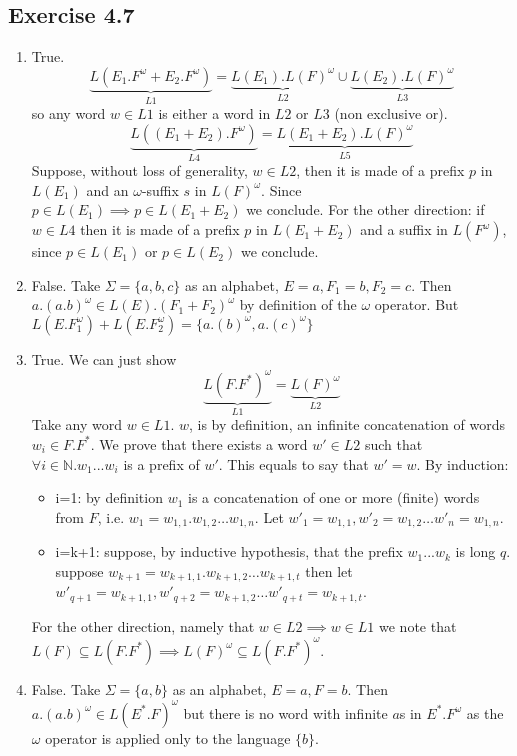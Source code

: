 \documentclass{article}
\begin{document}
	\subsection*{Exercise 4.7}
	\begin{enumerate}[label=(\alph*)]
		\item True. $$\underbrace{L(E_1.F^\omega + E_2.F^\omega)}_{L1} = \underbrace{L(E_1).L(F)^\omega}_{L2} \cup \underbrace{L(E_2).L(F)^\omega}_{L3} $$
		so any word $w \in L1$ is either a word in $L2$ or $L3$ (non exclusive or). 
		$$
		\underbrace{L((E_1+E_2).F^\omega)}_{L4} =
		\underbrace{L(E_1+E_2).L(F)^\omega}_{L5}
		$$
		Suppose, without loss of generality, $w \in L2$, then it is made of a prefix $p$ in $L(E_1)$ and an $\omega$-suffix $s$ in $L(F)^\omega$. Since $p \in L(E_1) \implies p \in L(E_1+E_2)$ we conclude. For the other direction: if $w \in L4$ then it is made of a prefix $p$ in $L(E_1 + E_2)$ and a suffix in $L(F^\omega)$, since $p \in L(E_1)$ or $p \in L(E_2)$ we conclude. 
		\item False. Take $\Sigma=\{a,b,c\}$ as an alphabet, $E=a, F_1=b, F_2=c$. Then $a.(a.b)^\omega \in L(E).(F_1+F_2)^\omega$ by definition of the $\omega$ operator. But $L(E.F^\omega_1)+L(E.F^\omega_2)=\{a.(b)^\omega, a.(c)^\omega\}$
		\item True. We can just show $$\underbrace{L(F.F^*)^\omega}_{L1}=\underbrace{L(F)^\omega}_{L2}$$ Take any word $w \in L1$. $w$, is by definition, an infinite concatenation of words $w_i \in F.F^*$. We prove that there exists a word $w'\in L2$ such that $\forall i \in \mathbb{N}. w_1...w_i$ is a prefix of $w'$. This equals to say that $w'=w$. By induction:
		\begin{itemize}
			\item i=1: by definition $w_1$ is a concatenation of one or more (finite) words from $F$, i.e. $w_1=w_{1,1}.w_{1,2}\dots w_{1,n}$. Let $w'_1=w_{1,1}, w'_2=w_{1,2}\dots w'_n=w_{1,n}$.
			\item i=k+1: suppose, by inductive hypothesis, that the prefix $w_1...w_k$ is long $q$. suppose $w_{k+1}=w_{k+1,1}.w_{k+1,2}\dots w_{k+1,t}$ then let $w'_{q+1}=w_{k+1,1}, w'_{q+2}=w_{k+1,2}\dots w'_{q+t}=w_{k+1,t}$.
		\end{itemize}
		For the other direction, namely that $w \in L2 \implies w \in L1$ we note that $L(F)\subseteq L(F.F^*) \implies L(F)^\omega \subseteq L(F.F^*)^\omega$.
		\item False. Take $\Sigma=\{a,b\}$ as an alphabet, $E=a, F=b$. Then $a.(a.b)^\omega \in L(E^*.F)^\omega$ but there is no word with infinite $a$s in $E^*.F^\omega$ as the $\omega$ operator is applied only to the language $\{b\}$.
	\end{enumerate}
\end{document}
